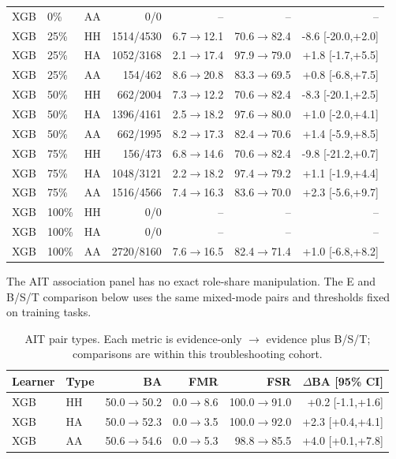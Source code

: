 \begin{longtable}{@{}llcrrrr@{}}
XGB & 0\% & AA & 0/0 & -- & -- & -- \\
XGB & 25\% & HH & 1514/4530 & 6.7$\rightarrow$12.1 & 70.6$\rightarrow$82.4 & -8.6 [-20.0,+2.0] \\
XGB & 25\% & HA & 1052/3168 & 2.1$\rightarrow$17.4 & 97.9$\rightarrow$79.0 & +1.8 [-1.7,+5.5] \\
XGB & 25\% & AA & 154/462 & 8.6$\rightarrow$20.8 & 83.3$\rightarrow$69.5 & +0.8 [-6.8,+7.5] \\
XGB & 50\% & HH & 662/2004 & 7.3$\rightarrow$12.2 & 70.6$\rightarrow$82.4 & -8.3 [-20.1,+2.5] \\
XGB & 50\% & HA & 1396/4161 & 2.5$\rightarrow$18.2 & 97.6$\rightarrow$80.0 & +1.0 [-2.0,+4.1] \\
XGB & 50\% & AA & 662/1995 & 8.2$\rightarrow$17.3 & 82.4$\rightarrow$70.6 & +1.4 [-5.9,+8.5] \\
XGB & 75\% & HH & 156/473 & 6.8$\rightarrow$14.6 & 70.6$\rightarrow$82.4 & -9.8 [-21.2,+0.7] \\
XGB & 75\% & HA & 1048/3121 & 2.2$\rightarrow$18.2 & 97.4$\rightarrow$79.2 & +1.1 [-1.9,+4.4] \\
XGB & 75\% & AA & 1516/4566 & 7.4$\rightarrow$16.3 & 83.6$\rightarrow$70.0 & +2.3 [-5.6,+9.7] \\
XGB & 100\% & HH & 0/0 & -- & -- & -- \\
XGB & 100\% & HA & 0/0 & -- & -- & -- \\
XGB & 100\% & AA & 2720/8160 & 7.6$\rightarrow$16.5 & 82.4$\rightarrow$71.4 & +1.0 [-6.8,+8.2] \\
\bottomrule\end{longtable}

The AIT association panel has no exact role-share manipulation. The E and B/S/T comparison below uses the same mixed-mode pairs and thresholds fixed on training tasks.

\begin{table}[ht]
\centering\compacttable
\caption{AIT pair types. Each metric is evidence-only $\rightarrow$ evidence plus B/S/T; comparisons are within this troubleshooting cohort.}
\label{tab:matched-ait-types}
\begin{tabular*}{\linewidth}{@{\extracolsep{\fill}}llrrrr@{}}
\toprule Learner & Type & BA & FMR & FSR & $\Delta$BA [95\% CI] \\
\midrule
XGB & HH & 50.0$\rightarrow$50.2 & 0.0$\rightarrow$8.6 & 100.0$\rightarrow$91.0 & +0.2 [-1.1,+1.6] \\
XGB & HA & 50.0$\rightarrow$52.3 & 0.0$\rightarrow$3.5 & 100.0$\rightarrow$92.0 & +2.3 [+0.4,+4.1] \\
XGB & AA & 50.6$\rightarrow$54.6 & 0.0$\rightarrow$5.3 & 98.8$\rightarrow$85.5 & +4.0 [+0.1,+7.8] \\
\bottomrule
\end{tabular*}
\end{table}


